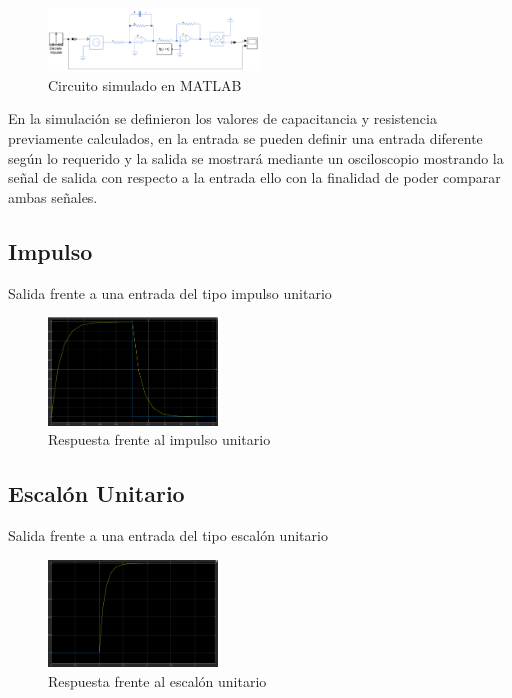 \documentclass[conference]{IEEEtran}
\begin{document}
	\begin{figure}[h]
		\centering
		\includegraphics[width=0.5\textwidth]{../INFORME PREVIO/media/circuito-matlab}
		\caption{Circuito simulado en MATLAB}
		\label{fig:circuito-matlab}
	\end{figure}
	
	En la simulación se definieron los valores de capacitancia y resistencia previamente calculados, en la entrada se pueden definir una entrada diferente según lo requerido y la salida se mostrará mediante un osciloscopio mostrando la señal de salida con respecto a la entrada ello con la finalidad de poder comparar ambas señales.
	
	\subsection{Impulso}
	Salida frente a una entrada del tipo impulso unitario
	\begin{figure}[h]
		\centering
		\includegraphics[width=0.4\textwidth]{../INFORME PREVIO/media/impulso}
		\caption{Respuesta frente al impulso unitario}
		\label{fig:impulso}
	\end{figure}
	
	
	\subsection{Escalón Unitario}
	Salida frente a una entrada del tipo escalón unitario
	\begin{figure}[h]
		\centering
		\includegraphics[width=0.4\textwidth]{../INFORME PREVIO/media/escalon_unitario}
		\caption{Respuesta frente al escalón unitario}
		\label{fig:escalonunitario}
	\end{figure}
	
\end{document}
